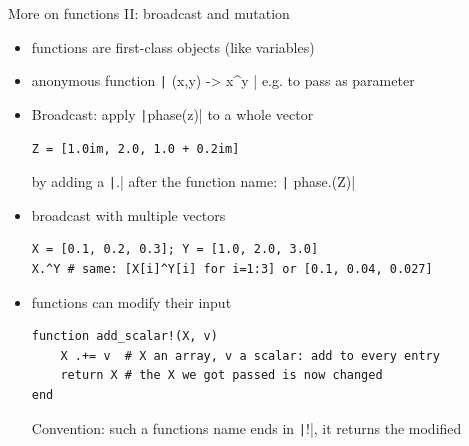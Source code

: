 \documentclass[aspectratio=169, 12pt]{beamer}
\begin{document}
    \begin{frame}[fragile]{More on functions II: broadcast and mutation}
        \begin{itemize}[<+->]
            \item functions are first-class objects (like variables)
            \item anonymous function \texttt|  (x,y) -> x^y  | e.g. to pass as parameter
            \item \alert{Broadcast}: apply \texttt|phase(z)| to a whole vector
            \begin{verbatim}
Z = [1.0im, 2.0, 1.0 + 0.2im]
            \end{verbatim}
            by adding a \texttt|.| after the function name: \texttt|    phase.(Z)|
            \item broadcast with multiple vectors
            \begin{verbatim}
X = [0.1, 0.2, 0.3]; Y = [1.0, 2.0, 3.0]
X.^Y # same: [X[i]^Y[i] for i=1:3] or [0.1, 0.04, 0.027]
            \end{verbatim}
            \item functions can modify their input
            \begin{verbatim}
function add_scalar!(X, v)
    X .+= v  # X an array, v a scalar: add to every entry
    return X # the X we got passed is now changed
end
            \end{verbatim}
            \alert{Convention:} such a functions name ends in \texttt|!|, it returns the modified
        \end{itemize}
    \end{frame}
\end{document}

